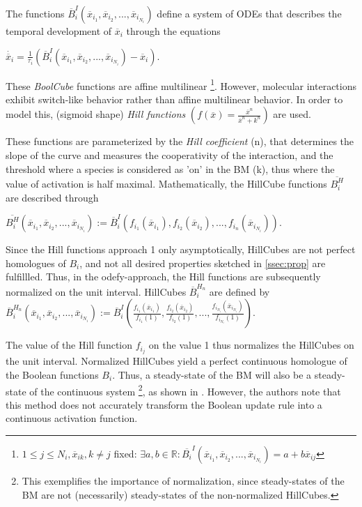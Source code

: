 \documentclass[11pt]{article}
\begin{document}
The functions $\overline{B}_{i}^{I} (\overline{x}_{i_{1}}, \overline{x}_{i_{2}},..., \overline{x}_{i_{N_{i}}} )$ define a system of ODEs that describes the temporal development of $\overline{x}_{i}$ through the equations 

$\dot{\overline{x}_{i}} = \frac{1}{\tau_{i}} (\overline{B}_{i}^{I} (\overline{x}_{i_{1}}, \overline{x}_{i_{2}},..., \overline{x}_{i_{N_{i}}}) - \overline{x}_{i} )$.

These \textit{BoolCube} functions are affine multilinear \footnote{$1 \leq j \leq N_{i} , \overline{x}_{ik}, k \neq j$ fixed: $ \exists a, b \in \mathbb{R} : \overline{B_{i}}^{I} (\overline{x}_{i_{1}}, \overline{x}_{i_{2}},..., \overline{x}_{i_{N_{i}}} ) = a + b \overline{x}_{ij}$}.
However, molecular interactions exhibit switch-like behavior rather than affine multilinear behavior. In order to model this, (sigmoid shape) \textit{Hill functions} $(f(\overline{x}) = \frac{\overline{x}^{n}}{ \overline{x}^{n} + k^{n}} )$ are used.

These functions are parameterized by the \textit{Hill coefficient} (n), that determines the slope of the curve and measures the cooperativity of the interaction, and the threshold where a species is considered as 'on' in the BM (k), thus where the value of activation is half maximal. Mathematically, the HillCube functions $\overline{B_{i}^{H}}$ are described through 

$\overline{B_{i}^{H}} (\overline{x}_{i_{1}}, \overline{x}_{i_{2}},..., \overline{x}_{i_{N_{i}}} ) := \overline{B}_{i}^{I} (f_{i_{1}}(\overline{x}_{i_{1}}), f_{i_{2}} (\overline{x}_{i_{2}}),..., f_{i_{n}} (\overline{x}_{i_{N_{i}}}) )$.

Since the Hill functions approach 1 only asymptotically, HillCubes are not perfect homologues of $B_{i}$, and not all desired properties sketched in \ref{ssec:prop} are fulfillled. Thus, in the odefy-approach, the Hill functions are subsequently normalized on the unit interval. HillCubes $\overline{B}_{i}^{H_{n}}$ are defined by $\overline{B}_{i}^{H_{n}} (\overline{x}_{i_{1}}, \overline{x}_{i_{2}}, ..., \overline{x}_{i_{N_{i}}}) := \overline{B}_{i}^{I} ( \frac{f_{i_{1}}(\overline{x}_{i_1})}{f_{i_{1}} (1)}, \frac{f_{i_{2}}(\overline{x}_{i_2})}{f_{i_{2}} (1)}, ..., \frac{f_{i_{N_{i}}}(\overline{x}_{i_{N_{i}}})}{f_{i_{N_{i}}} (1)})$.

The value of the Hill function $f_{i_{j}}$ on the value 1 thus normalizes the HillCubes on the unit interval. Normalized HillCubes yield a perfect continuous homologue of the Boolean functions $B_{i}$. Thus, a steady-state of the BM will
also be a steady-state of the continuous system \footnote{This exemplifies the importance of normalization, since steady-states of the BM are not (necessarily) steady-states of the non-normalized HillCubes.}, as shown in \cite{Wittmann}. However, the authors note that this method does not accurately transform the Boolean update rule into a continuous activation function. 
\end{document}
